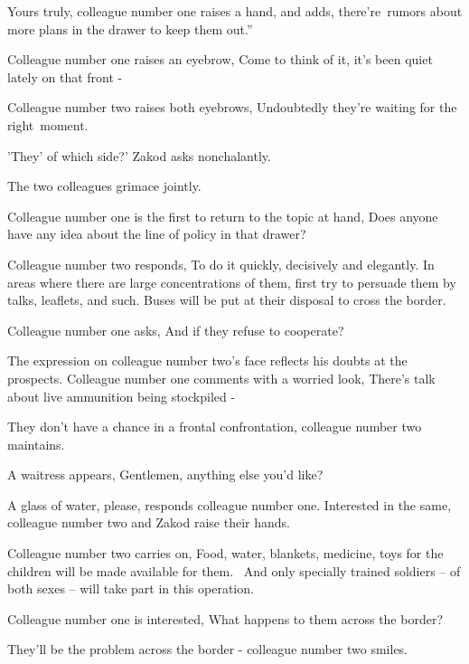 \documentclass[12pt]{book}
\begin{document}
{\textquotedbl}Yours truly,{\textquotedbl} colleague number one raises a hand, and adds, {\textquotedbl}there're~rumors
about more plans in the drawer to keep them out.''

Colleague number one raises an eyebrow, {\textquotedbl}Come to think of it, it's been quiet lately on that front
-{\textquotedbl}

Colleague number two raises both eyebrows, {\textquotedbl}Undoubtedly they're waiting for the
right~moment.{\textquotedbl}

{\textquotedbl}'They' of which side?{\textquotedbl}' Zakod asks nonchalantly.

The two colleagues grimace jointly.

Colleague number one is the first to return to the topic at hand, {\textquotedbl}Does anyone have any idea about the
line of policy in that drawer?{\textquotedbl}

Colleague number two responds, {\textquotedbl}To do it quickly, decisively and elegantly. In areas where there are large
concentrations of them, first try to persuade them by talks, leaflets, and such. Buses will be put at their disposal to
cross the border.{\textquotedbl}

Colleague number one asks, {\textquotedbl}And if they refuse to cooperate?{\textquotedbl}

The expression on colleague number two's face reflects his doubts at the prospects. Colleague number one comments with a
worried look, {\textquotedbl}There's talk about live ammunition being stockpiled -{\textquotedbl}~

{\textquotedbl}They don't have a chance in a frontal confrontation,{\textquotedbl} colleague number two maintains.

A waitress appears, {\textquotedbl}Gentlemen, anything else you'd like?{\textquotedbl}

{\textquotedbl}A glass of water, please,{\textquotedbl} responds colleague number one. Interested in the same, colleague
number two and Zakod raise their hands.

Colleague number two carries on, {\textquotedbl}Food, water, blankets, medicine, toys for the children will be made
available for them. ~And only specially trained soldiers -- of both sexes -- will take part in this
operation.{\textquotedbl}

Colleague number one is interested, {\textquotedbl}What happens to them across the border?{\textquotedbl}

{\textquotedbl}They'll be the problem across the border -{\textquotedbl} colleague number two smiles.
\end{document}
